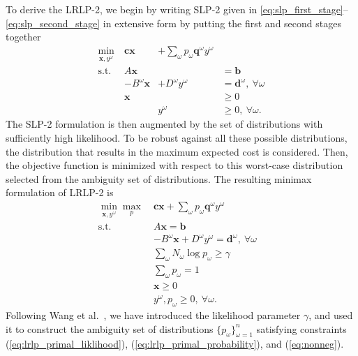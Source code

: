 \documentclass[12pt]{amsart}
\newcommand{\x}{\mathbf{x}}
\renewcommand{\c}{\mathbf{c}}
\newcommand{\q}{\mathbf{q}}
\renewcommand{\b}{\mathbf{b}}
\renewcommand{\d}{\mathbf{d}}
\newcommand{\st}{\mbox{s.t.}}
\begin{document}
To derive the LRLP-2, we begin by writing SLP-2 given in \eqref{eq:slp_first_stage}--\eqref{eq:slp_second_stage} in extensive form by putting the first and second stages together
\[
	\begin{array}{rrrl}
		\min_{\x,y^\omega} \ & \c\x & + \sum_\omega p_\omega \q^\omega y^\omega \label{eq:slp2cost} \\
		\st \ & A\x & & = \b \nonumber \\
		& -B^\omega \x & + D^\omega y^\omega & = \d^\omega,\ \forall \omega \nonumber \\
		& \x & & \geq 0 \nonumber \\
		& & y^\omega & \geq 0,\ \forall \omega. \nonumber
	\end{array}
\]
The SLP-2 formulation is then augmented by the set of distributions with sufficiently high likelihood. 
To be robust against all these possible distributions, the distribution that results in the maximum expected cost is considered. 
Then, the objective function is minimized with respect to this worst-case distribution selected from the ambiguity set of distributions.
The resulting minimax formulation of LRLP-2 is
\begin{align}
	\min_{\x,y^\omega} \max_p \ & \c\x + \sum_\omega p_\omega \q^\omega y^\omega \label{eq:lrlp_primal}\\
	\st \ & A\x = \b \nonumber \\
	& -B^\omega \x + D^\omega y^\omega = \d^\omega,\ \forall \omega \nonumber \\
	& \sum_\omega N_\omega \log p_\omega \geq \gamma &   \label{eq:lrlp_primal_liklihood} \\
	& \sum_\omega p_\omega = 1 &   \label{eq:lrlp_primal_probability} \\
	& \x \geq 0 \nonumber \\
	& y^\omega, p_\omega \geq 0,\ \forall \omega. \label{eq:nonneg}
\end{align}
Following Wang et al.\ \cite{wang2010likelihood}, we have introduced the likelihood parameter $\gamma$, and used it to construct the ambiguity set of distributions $\{p_\omega\}_{\omega=1}^{n}$ satisfying constraints (\ref{eq:lrlp_primal_liklihood}), (\ref{eq:lrlp_primal_probability}), and (\ref{eq:nonneg}).
\end{document}
